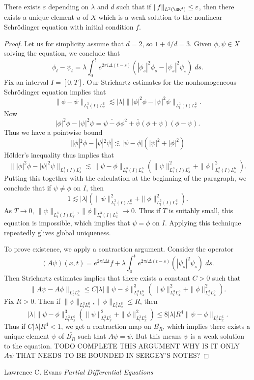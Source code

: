 \begin{lemma}
    There exists $\varepsilon$ depending on $\lambda$ and $d$ such that if $\| f \|_{L^2(\RR^d)} \leq \varepsilon$, then there exists a unique element $u$ of $X$ which is a weak solution to the nonlinear Schr\"{o}dinger equation with initial condition $f$.
\end{lemma}
\begin{proof}
  Let us for simplicity assume that $d = 2$, so $1 + 4/d = 3$. Given $\phi,\psi \in X$ solving the equation, we conclude that
  \[ \phi_t - \psi_t = \lambda \int_0^t e^{2 \pi i \Delta (t - s)} \left( |\phi_s|^2 \phi_s - |\psi_s|^2 \psi_s \right)\; ds. \]
  Fix an interval $I = [0,T]$. Our Strichartz estimates for the nonhomogeneous Schr\"{o}dinger equation implies that
  \[ \| \phi - \psi \|_{L^3_t(I) L^6_x} \lesssim |\lambda| \| |\phi|^2 \phi - |\psi|^2 \psi\|_{L^1_t(I) L^2_x}. \]
  Now
  \[ |\phi|^2 \phi - |\psi|^2 \psi = \overline{\psi - \phi} \phi^2 + \overline{\psi} (\phi + \psi)(\phi - \psi). \]
  Thus we have a pointwise bound
  \[ ||\phi|^2 \phi - |\psi|^2 \psi| \lesssim |\psi - \phi| (|\psi|^2 + |\phi|^2) \]
  H\"{o}lder's inequality thus implies that
  \[ \| |\phi|^2 \phi - |\psi|^2 \psi\|_{L^1_t(I) L^2_x} \lesssim \| \psi - \phi \|_{L^3_t(I) L^6_x} \left( \| \psi \|_{L^3_t(I) L^6_x}^2 + \| \phi \|_{L^3_t(I) L^6_x}^2 \right). \]
  Putting this together with the calculation at the beginning of the paragraph, we conclude that if $\psi \neq \phi$ on $I$, then
  \[ 1 \lesssim |\lambda| \left( \| \psi \|_{L^3_t(I) L^6_x}^2 + \| \phi \|_{L^3_t(I) L^6_x}^2 \right). \]
  As $T \to 0$, $\| \psi \|_{L^3_t(I) L^6_x}, \| \phi \|_{L^3_t(I) L^6_x} \to 0$. Thus if $T$ is suitably small, this equation is impossible, which implies that $\psi = \phi$ on $I$. Applying this technique repeatedly glives global uniqueness.

  To prove existence, we apply a contraction argument. Consider the operator
  \[ (A \psi)(x,t) = e^{2 \pi i \Delta t} f + \lambda \int_0^t e^{2 \pi i \Delta (t - s)} ( |\psi_s|^2 \psi_s )\; ds. \]
  Then Strichartz estimates implies that there exists a constant $C > 0$ such that
  \[ \| A \psi - A \phi \|_{L^3_t L^6_x} \leq C |\lambda| \| \psi - \phi \|_{L^3_t L^6_x}^3 \left( \| \psi \|_{L^3_t L^6_x}^2 + \| \phi \|_{L^3_t L^6_x}^2 \right). \]
  Fix $R > 0$. Then if $\| \psi \|_{L^3_t L^6_x}, \| \phi \|_{L^3_t L^6_x} \leq R$, then
  \[ |\lambda| \| \psi - \phi \|_{L^3_t L^6_x}^3 \left( \| \psi \|_{L^3_t L^6_x}^2 + \| \phi \|_{L^3_t L^6_x}^2 \right) \leq 8|\lambda| R^4 \| \psi - \phi \|_{L^3_t L^6_x}. \]
  Thus if $C |\lambda| R^4 < 1$, we get a contraction map on $\overline{B_R}$, which implies there exists a unique element $\psi$ of $\overline{B_R}$ such that $A\psi = \psi$. But this means $\psi$ is a weak solution to the equation. TODO COMPLETE THIS ARGUMENT WHY IS IT ONLY $A\psi$ THAT NEEDS TO BE BOUNDED IN SERGEY'S NOTES?
\end{proof}








\begin{thebibliography}{9}

Lawrence C. Evans
\textit{Partial Differential Equations}

\end{thebibliography}

 